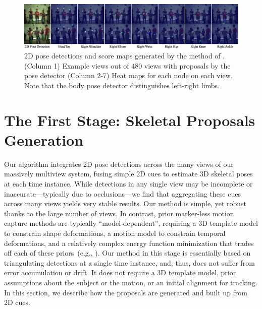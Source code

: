 \begin{figure}[t]
	\includegraphics[width=\linewidth]{figures/HeatMaps3}
	\caption{2D pose detections and score maps generated by the method of \cite{Wei2016}. (Column 1) Example views out of 480 views with proposals by the pose detector (Column 2-7) Heat maps for each node on each view. Note that the body pose detector distinguishes left-right limbs.}\label{fig:poseDetection}
\end{figure}
\section{The First Stage: Skeletal Proposals Generation}
Our algorithm integrates 2D pose detections across the many views of our massively multiview system, fusing simple 2D cues to estimate 3D skeletal poses at each time instance.
While detections in any single view may be incomplete or inaccurate---typically due to occlusions---we find that aggregating these cues across many views yields very stable results. Our method is simple, yet robust thanks to the large number of views. In contrast, prior marker-less motion capture methods are typically ``model-dependent'', requiring a 3D template model to constrain shape deformations, a motion model to constrain temporal deformations, and a relatively complex energy function minimization that trades off each of these priors~(e.g., \cite{Gall-09,Furukawa-2008, Elhayek-16}). Our method in this stage is essentially based on triangulating detections at a single time instance, and, thus, does not suffer from error accumulation or drift. It does not require a 3D template model, prior assumptions about the subject or the motion, or an initial alignment for tracking. In this section, we describe how the proposals are generated and built up from 2D cues.  

